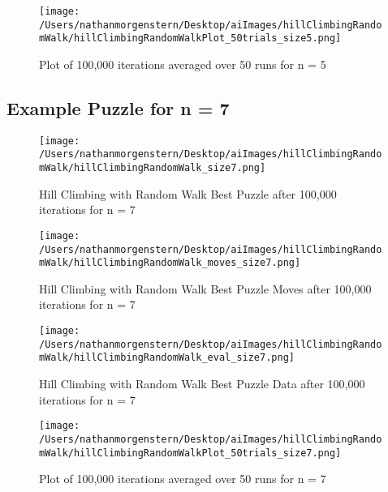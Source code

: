 \documentclass{report}
\begin{document}
	\begin{figure}[H]
	\centering
	\texttt{[image: /Users/nathanmorgenstern/Desktop/aiImages/hillClimbingRandomWalk/hillClimbingRandomWalkPlot\_50trials\_size5.png]}
	\caption{Plot of 100,000 iterations averaged over 50 runs for n = 5}
	\label{fig: Plot of 100,000 iterations averaged over 50 runs for n = 5}
	\end{figure}

\subsection{Example Puzzle for n = 7}

	\begin{figure}[H]
	\centering
	\texttt{[image: /Users/nathanmorgenstern/Desktop/aiImages/hillClimbingRandomWalk/hillClimbingRandomWalk\_size7.png]}
	\caption{Hill Climbing with Random Walk Best Puzzle after 100,000 iterations for n = 7} 
	\label{fig: Hill Climbing with Random Walk Best Puzzle after 100,000 iterations for n = 7}
	\end{figure}
	
	\begin{figure}[H]
	\centering
	\texttt{[image: /Users/nathanmorgenstern/Desktop/aiImages/hillClimbingRandomWalk/hillClimbingRandomWalk\_moves\_size7.png]}
	\caption{Hill Climbing with Random Walk Best Puzzle Moves after 100,000 iterations for n = 7} 
	\label{fig: Hill Climbing with Random Walk Best Puzzle Moves after 100,000 iterations for n = 7}
	\end{figure}

	\begin{figure}[H]
	\centering
	\texttt{[image: /Users/nathanmorgenstern/Desktop/aiImages/hillClimbingRandomWalk/hillClimbingRandomWalk\_eval\_size7.png]}
	\caption{Hill Climbing with Random Walk Best Puzzle Data after 100,000 iterations for n = 7} 
	\label{fig: Hill Climbing with Random Walk Best Puzzle Data after 100,000 iterations for n = 7}
	\end{figure}

	\begin{figure}[H]
	\centering
	\texttt{[image: /Users/nathanmorgenstern/Desktop/aiImages/hillClimbingRandomWalk/hillClimbingRandomWalkPlot\_50trials\_size7.png]}
	\caption{Plot of 100,000 iterations averaged over 50 runs for n = 7}
	\label{fig: Plot of 100,000 iterations averaged over 50 runs for n = 7}
	\end{figure}
	
\end{document}
